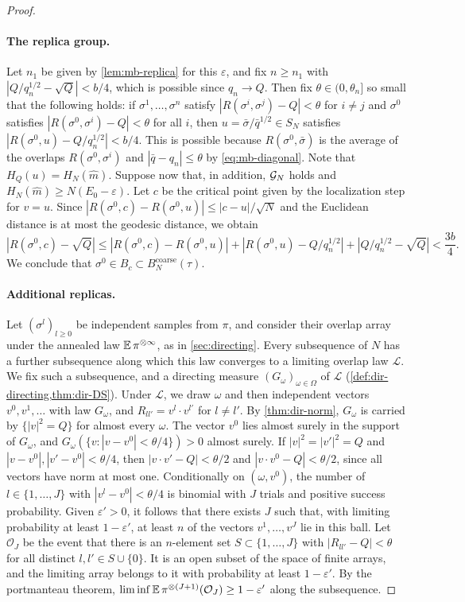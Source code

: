 \begin{proof}
\paragraph{The replica group.}
Let $n_1$ be given by \cref{lem:mb-replica} for this $\varepsilon$, and fix $n\ge n_1$ with $|Q/q_n^{1/2}-\sqrt Q|<b/4$, which is possible since $q_n\to Q$. Then fix $\theta\in(0,\theta_n]$ so small that the following holds: if $\sigma^1,\dots,\sigma^n$ satisfy $|R(\sigma^i,\sigma^j)-Q|<\theta$ for $i\neq j$ and $\sigma^0$ satisfies $|R(\sigma^0,\sigma^i)-Q|<\theta$ for all $i$, then $u=\bar\sigma/\bar q^{1/2}\in S_N$ satisfies $|R(\sigma^0,u)-Q/q_n^{1/2}|<b/4$. This is possible because $R(\sigma^0,\bar\sigma)$ is the average of the overlaps $R(\sigma^0,\sigma^i)$ and $|\bar q-q_n|\le\theta$ by \eqref{eq:mb-diagonal}. Note that $H_Q(u)=H_N(\widehat m)$. Suppose now that, in addition, $\mathcal G_N$ holds and $H_N(\widehat m)\ge N(E_0-\varepsilon)$. Let $c$ be the critical point given by the localization step for $v=u$. Since $|R(\sigma^0,c)-R(\sigma^0,u)|\le|c-u|/\sqrt N$ and the Euclidean distance is at most the geodesic distance, we obtain
\[
|R(\sigma^0,c)-\sqrt Q|\le|R(\sigma^0,c)-R(\sigma^0,u)|+|R(\sigma^0,u)-Q/q_n^{1/2}|+|Q/q_n^{1/2}-\sqrt Q|<\frac{3b}4 .
\]
We conclude that $\sigma^0\in B_c\subset B^{\mathrm{coarse}}_N(\tau)$.

\paragraph{Additional replicas.}
Let $(\sigma^l)_{l\ge0}$ be independent samples from $\pi$, and consider their overlap array under the annealed law $\mathbb E\,\pi^{\otimes\infty}$, as in \cref{sec:directing}. Every subsequence of $N$ has a further subsequence along which this law converges to a limiting overlap law $\mathcal L$. We fix such a subsequence, and a directing measure $(G_\omega)_{\omega\in\Omega}$ of $\mathcal L$ (\cref{def:dir-directing,thm:dir-DS}). Under $\mathcal L$, we draw $\omega$ and then independent vectors $v^0,v^1,\dots$ with law $G_\omega$, and $R_{ll'}=v^l\cdot v^{l'}$ for $l\neq l'$. By \cref{thm:dir-norm}, $G_\omega$ is carried by $\{|v|^2=Q\}$ for almost every $\omega$. The vector $v^0$ lies almost surely in the support of $G_\omega$, and $G_\omega(\{v:|v-v^0|<\theta/4\})>0$ almost surely. If $|v|^2=|v'|^2=Q$ and $|v-v^0|,|v'-v^0|<\theta/4$, then $|v\cdot v'-Q|<\theta/2$ and $|v\cdot v^0-Q|<\theta/2$, since all vectors have norm at most one. Conditionally on $(\omega,v^0)$, the number of $l\in\{1,\dots,J\}$ with $|v^l-v^0|<\theta/4$ is binomial with $J$ trials and positive success probability. Given $\varepsilon'>0$, it follows that there exists $J$ such that, with limiting probability at least $1-\varepsilon'$, at least $n$ of the vectors $v^1,\dots,v^J$ lie in this ball. Let $\mathcal O_J$ be the event that there is an $n$-element set $S\subset\{1,\dots,J\}$ with $|R_{ll'}-Q|<\theta$ for all distinct $l,l'\in S\cup\{0\}$. It is an open subset of the space of finite arrays, and the limiting array belongs to it with probability at least $1-\varepsilon'$. By the portmanteau theorem, $\liminf\mathbb E\,\pi^{\otimes(J+1)}(\mathcal O_J)\ge1-\varepsilon'$ along the subsequence.


\end{proof}
